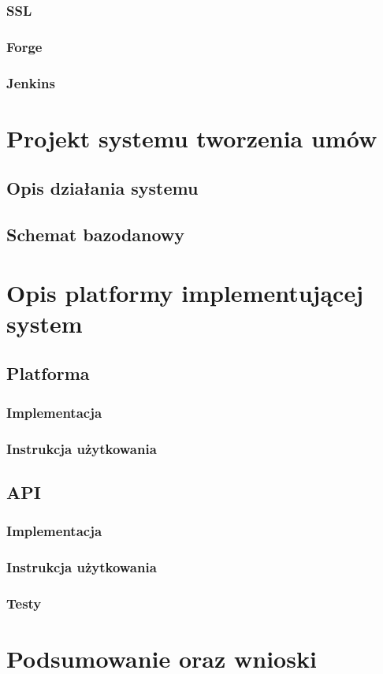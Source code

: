 \documentclass[12pt]{report}
\begin{document}
            \subsection{SSL}
                
            \subsection{Forge}
                
            \subsection{Jenkins}
                
    \chapter{Projekt systemu tworzenia umów}
         \section{Opis działania systemu}
         \section{Schemat bazodanowy}
    \chapter{Opis platformy implementującej system}
        \section{Platforma}
            \subsection{Implementacja}
            \subsection{Instrukcja użytkowania}
        \section{API}
            \subsection{Implementacja}
            \subsection{Instrukcja użytkowania}
            \subsection{Testy}
    \chapter{Podsumowanie oraz wnioski}
    \listoffigures
    
\end{document}
